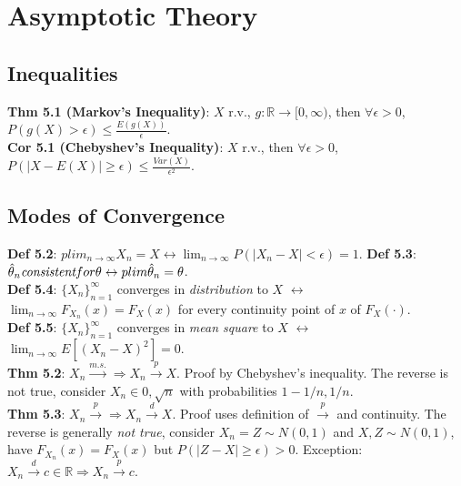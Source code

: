 \section{Asymptotic Theory}
\subsection{Inequalities}
\textbf{Thm 5.1 (Markov's Inequality)}: $X$ r.v., $g: \mathbb{R} \to [0, \infty)$, then $\forall \epsilon > 0$, $P(g(X) > \epsilon) \leq \frac{E(g(X))}{\epsilon}$.\\
\textbf{Cor 5.1 (Chebyshev's Inequality)}: $X$ r.v., then $\forall \epsilon > 0$, $P(|X-E(X)| \geq \epsilon) \leq \frac{Var(X)}{\epsilon^2}$.

\subsection{Modes of Convergence}
\textbf{Def 5.2}: $plim_{n\to\infty}X_n = X \leftrightarrow \lim_{n\to\infty}P(|X_n-X|<\epsilon) = 1$.
\textbf{Def 5.3}: $\hat{\theta}_n \emph{consistent} for \theta \leftrightarrow plim\hat{\theta}_n = \theta$. \\
\textbf{Def 5.4}: $\{X_n\}_{n=1}^\infty$ converges in \emph{distribution} to $X$ $\leftrightarrow$ $\lim_{n\to\infty}F_{X_n}(x) = F_X(x)$ for every continuity point of $x$ of $F_X(\cdot)$. \\
\textbf{Def 5.5}: $\{X_n\}_{n=1}^\infty$ converges in \emph{mean square} to $X$ $\leftrightarrow$ $\lim_{n\to\infty}E[(X_n-X)^2] = 0$. \\
\textbf{Thm 5.2}: $X_n \xrightarrow{m.s.} \Rightarrow X_n \xrightarrow{p}X$. Proof by Chebyshev's inequality. The reverse is not true, consider $X_n \in{0, \sqrt{n}}$ with probabilities $1-1/n, 1/n$.\\
\textbf{Thm 5.3}: $X_n \xrightarrow{p} \Rightarrow X_n \xrightarrow{d}X$. Proof uses definition of $\xrightarrow{p}$ and continuity. The reverse is generally \emph{not true}, consider $X_n = Z \sim N(0,1)$ and $X, Z \sim N(0, 1)$, have $F_{X_n}(x) = F_X(x)$ but $P(|Z-X|\geq\epsilon) > 0$. Exception: $X_n \xrightarrow{d} c \in \mathbb{R} \Rightarrow X_n \xrightarrow{p} c$.

